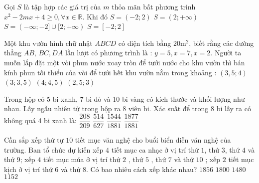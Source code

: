 \begin{ex}%
	Gọi $S$ là tập hợp các giá trị của $m$ thỏa mãn bất phương trình $x^2-2 m x+4 \geq 0, \forall x \in \mathbb{R}$. Khi đó
	\choice
	{$S=(-2 ; 2)$}
	{$S=(2 ;+\infty)$}
	{$S=(-\infty ;-2] \cup[2 ;+\infty)$}
	{\True $S=[-2 ; 2]$}
\end{ex}

\begin{ex}%
	Một khu vườn hình chữ nhật $A B C D$ có diện tích bằng $20 \text{m}^2$, biết rằng các đường thẳng $A B$, $B C, D A$ lần lượt có phương trình là : $y=5, x=7, x=2$. Người ta muốn lắp đặt một vòi phun nước xoay tròn để tưới nước cho khu vườn thì bán kính phun tối thiểu của vòi để tưới hết khu vườn nằm trong khoảng :
	\choice
	{$(3,5 ; 4)$}
	{\True $(3 ; 3,5)$}
	{$(4 ; 4,5)$}
	{$(2,5 ; 3)$}
\end{ex}

\begin{ex}%
	Trong hộp có 5 bi xanh, 7 bi đỏ và 10 bi vàng có kích thước và khối lượng như nhau. Lấy ngẫu nhiên từ trong hộp ra 8 viên bi. Xác suất để trong 8 bi lấy ra có không quá 4 bi xanh là:
	\choice
	{$\dfrac{208}{209}$}
	{$\dfrac{514}{627}$}
	{$\dfrac{1544}{1881}$}
	{\True $\dfrac{1877}{1881}$}
\end{ex}

\begin{ex}%
	Cần sắp xếp thứ tự $ 10 $ tiết mục văn nghệ cho buổi biển diễn văn nghệ của trường. Ban tổ chức dự kiến xếp $ 4 $ tiết mục ca nhạc ở vị trí thứ $ 1 $, thứ $ 3 $, thứ $ 4 $ và thứ $ 9 $; xếp $ 4 $ tiết mục múa ở vị trí thứ $ 2 $ , thứ $ 5 $ , thứ $ 7 $ và thứ $10$ ; xếp $2$ tiết mục kịch ở vị trí thứ $ 6 $ và thứ $ 8 $. Có bao nhiêu cách xếp khác nhau?
	\choice
	{$1856$}
	{$1800$}
	{$1480$}
	{\True $1152$}
\end{ex}


